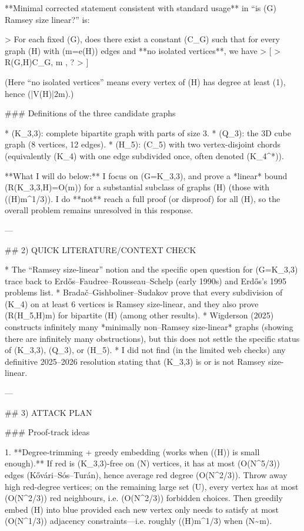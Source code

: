 **Minimal corrected statement consistent with standard usage** in “is (G) Ramsey size linear?” is:

> For each fixed (G), does there exist a constant (C_G) such that for every graph (H) with (m=e(H)) edges and **no isolated vertices**, we have
> [
> R(G,H)\le C_G, m , ?
> ]

(Here “no isolated vertices” means every vertex of (H) has degree at least (1), hence (|V(H)|\le 2m).)

### Definitions of the three candidate graphs

* (K_{3,3}): complete bipartite graph with parts of size 3.
* (Q_3): the 3D cube graph (8 vertices, 12 edges).
* (H_5): (C_5) with two vertex-disjoint chords (equivalently (K_4) with one edge subdivided once, often denoted (K_4^*)).

**What I will do below:** I focus on (G=K_{3,3}), and prove a *linear* bound (R(K_{3,3},H)=O(m)) for a substantial subclass of graphs (H) (those with (\Delta(H)\le m^{1/3})). I do **not** reach a full proof (or disproof) for all (H), so the overall problem remains unresolved in this response.

---

## 2) QUICK LITERATURE/CONTEXT CHECK

* The “Ramsey size-linear” notion and the specific open question for (G=K_{3,3}) trace back to Erdős–Faudree–Rousseau–Schelp (early 1990s) and Erdős’s 1995 problems list.
* Bradač–Gishboliner–Sudakov prove that every subdivision of (K_4) on at least 6 vertices is Ramsey size-linear, and they also prove (R(H_5,H)\ll m) for bipartite (H) (among other results).
* Wigderson (2025) constructs infinitely many *minimally non–Ramsey size-linear* graphs (showing there are infinitely many obstructions), but this does not settle the specific status of (K_{3,3}), (Q_3), or (H_5).
* I did not find (in the limited web checks) any definitive 2025–2026 resolution stating that (K_{3,3}) is or is not Ramsey size-linear.

---

## 3) ATTACK PLAN

### Proof-track ideas

1. **Degree-trimming + greedy embedding (works when (\Delta(H)) is small enough).**
   If red is (K_{3,3})-free on (N) vertices, it has at most (O(N^{5/3})) edges (Kővári–Sós–Turán), hence average red degree (O(N^{2/3})). Throw away high red-degree vertices; on the remaining large set (U), every vertex has at most (O(N^{2/3})) red neighbours, i.e. (O(N^{2/3})) forbidden choices.
   Then greedily embed (H) into blue provided each new vertex only needs to satisfy at most (O(N^{1/3})) adjacency constraints—i.e. roughly (\Delta(H)\lesssim m^{1/3}) when (N\sim m).

